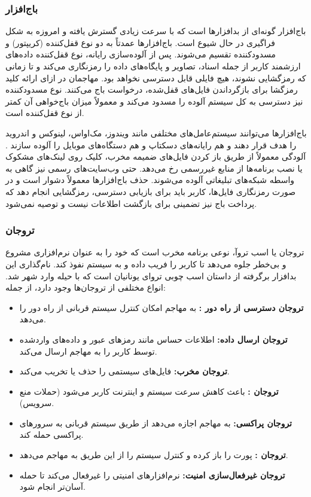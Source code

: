 \subsubsection{باج‌افزار}
باج‌افزار گونه‌ای از بدافزارها است که با سرعت زیادی گسترش یافته و امروزه به شکل فراگیری در حال شیوع است. باج‌افزارها عمدتاً به دو نوع قفل‌کننده (کریپتور) و مسدودکننده تقسیم می‌شوند. پس از آلوده‌سازی رایانه، نوع قفل‌کننده داده‌های ارزشمند کاربر از جمله اسناد، تصاویر و پایگاه‌های داده را رمزنگاری می‌کند و تا زمانی که رمزگشایی نشوند، هیچ فایلی قابل دسترسی نخواهد بود. مهاجمان در ازای ارائه کلید رمزگشا برای بازگرداندن فایل‌های قفل‌شده، درخواست باج می‌کنند. نوع مسدودکننده نیز دسترسی به کل سیستم آلوده را مسدود می‌کند و معمولاً میزان باج‌خواهی آن کمتر از نوع قفل‌کننده است.

باج‌افزارها می‌توانند سیستم‌عامل‌های مختلفی مانند ویندوز، مک‌اواس، لینوکس و اندروید را هدف قرار دهند و هم رایانه‌های دسکتاپ و هم دستگاه‌های موبایل را آلوده سازند \cite{AndroidSecurity}. آلودگی معمولاً از طریق باز کردن فایل‌های ضمیمه مخرب، کلیک روی لینک‌های مشکوک یا نصب برنامه‌ها از منابع غیررسمی رخ می‌دهد. حتی وب‌سایت‌های رسمی نیز گاهی به واسطه شبکه‌های تبلیغاتی آلوده می‌شوند. حذف باج‌افزارها معمولاً دشوار است و در صورت رمزنگاری فایل‌ها، کاربر باید برای بازیابی دسترسی، رمزگشایی انجام دهد که پرداخت باج نیز تضمینی برای بازگشت اطلاعات نیست و توصیه نمی‌شود.

\subsubsection{تروجان}
تروجان یا اسب تروآ، نوعی برنامه مخرب است که خود را به عنوان نرم‌افزاری مشروع و بی‌خطر جلوه می‌دهد تا کاربر را فریب داده و به سیستم نفوذ کند. نام‌گذاری این بدافزار برگرفته از داستان اسب چوبی تروای یونانیان است که با حیله وارد شهر شد. انواع مختلفی از تروجان‌ها وجود دارد، از جمله:
\begin{itemize}
    \item \textbf{تروجان دسترسی از راه دور :} به مهاجم امکان کنترل سیستم قربانی از راه دور را می‌دهد.
    \item \textbf{تروجان ارسال داده:} اطلاعات حساس مانند رمزهای عبور و داده‌های واردشده توسط کاربر را به مهاجم ارسال می‌کند.
    \item \textbf{تروجان مخرب:} فایل‌های سیستمی را حذف یا تخریب می‌کند.
    \item \textbf{تروجان :} باعث کاهش سرعت سیستم و اینترنت کاربر می‌شود (حملات منع سرویس).
    \item \textbf{تروجان پراکسی:} به مهاجم اجازه می‌دهد از طریق سیستم قربانی به سرورهای پراکسی حمله کند.
    \item \textbf{تروجان :} پورت  را باز کرده و کنترل سیستم را از این طریق به مهاجم می‌دهد.
    \item \textbf{تروجان غیرفعال‌سازی امنیت:} نرم‌افزارهای امنیتی را غیرفعال می‌کند تا حمله آسان‌تر انجام شود.
\end{itemize}

